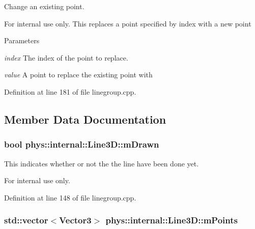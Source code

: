 Change an existing point. 

\begin{DoxyInternal}{For internal use only.}
This replaces a point specified by index with a new point 
\begin{DoxyParams}{Parameters}
\item[{\em index}]The index of the point to replace. \item[{\em value}]A point to replace the existing point with \end{DoxyParams}
\end{DoxyInternal}


Definition at line 181 of file linegroup.cpp.



\subsection{Member Data Documentation}
\hypertarget{classphys_1_1internal_1_1Line3D_a7f3a190db3c0cd83ff4fdf3d95d6f0ee}{
\subsubsection[{mDrawn}]{\setlength{\rightskip}{0pt plus 5cm}bool {\bf phys::internal::Line3D::mDrawn}}}
\label{d4/db5/classphys_1_1internal_1_1Line3D_a7f3a190db3c0cd83ff4fdf3d95d6f0ee}


This indicates whether or not the the line have been done yet. 

\begin{DoxyInternal}{For internal use only.}
\end{DoxyInternal}


Definition at line 148 of file linegroup.cpp.

\hypertarget{classphys_1_1internal_1_1Line3D_acb6b813e2d713dbad02fe5a5ca1af97e}{
\subsubsection[{mPoints}]{\setlength{\rightskip}{0pt plus 5cm}std::vector$<$Vector3$>$ {\bf phys::internal::Line3D::mPoints}}}
\label{d4/db5/classphys_1_1internal_1_1Line3D_acb6b813e2d713dbad02fe5a5ca1af97e}



